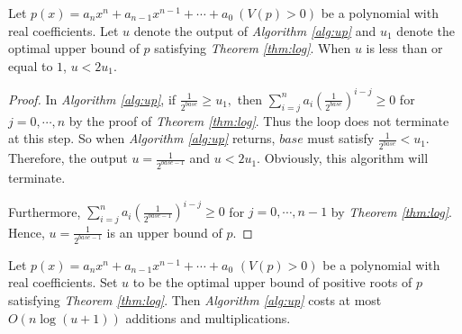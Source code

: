 \begin{theorem}
	\label{thm:two}
	Let $p(x)=a_nx^n+a_{n-1}x^{n-1}+\cdots+a_0\ (V(p)> 0)$ be a polynomial with real coefficients. Let  $u$ denote the output of {\em Algorithm \ref{alg:up}} and $u_1$ denote the optimal upper bound of $p$ satisfying
	{\em Theorem \ref{thm:log}}. When $u$ is less than or equal to $1$, $u<2u_1$.
\end{theorem}

\begin{proof}
	In {\em Algorithm \ref{alg:up}}, if  $\frac{1}{2^{base}}\ge u_1,$ then $ \sum_{i=j}^na_i\left( {\frac{1}{2^{base}} }
	\right)^{i-j} \ge 0$ for $j=0,\cdots, n$ by the proof of {\em Theorem \ref{thm:log}}. Thus
	the loop does not terminate at this step.
	So when {\em Algorithm \ref{alg:up}} returns, $base$ must satisfy $\frac{1}{2^{base}}<u_1$. Therefore, the output $u=\frac{1}{2^{base-1}}$ and $u<2u_1$.
	Obviously, this algorithm will terminate.
	
	Furthermore,  $ \sum_{i=j}^na_i\left( {\frac{1}{2^{base-1}} } \right)^{i-j}\ge 0$ for $j=0,\cdots, n-1$ by {\em Theorem \ref{thm:log}}. Hence, $u=\frac{1}{2^{base-1}}$ is an upper bound of $p$.
\end{proof}

\begin{corollary}
	Let $p(x)=a_nx^n+a_{n-1}x^{n-1}+\cdots+a_0$ $ (V(p)> 0)$ be a polynomial with real coefficients. Set $u$ to be the optimal upper bound of positive roots of $p$ satisfying {\em Theorem	\ref{thm:log}}. Then  {\em Algorithm \ref{alg:up}} costs at most $O(n\log(u+1))$  additions and multiplications. %
\end{corollary}


